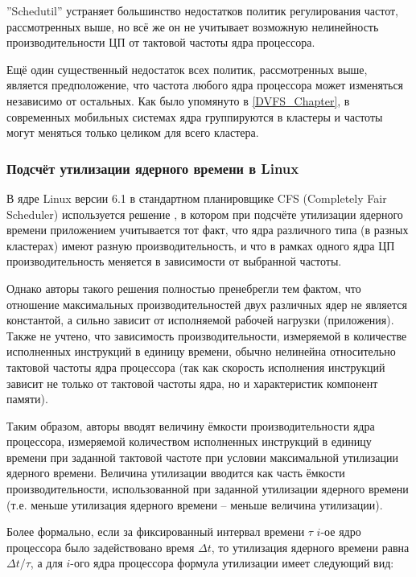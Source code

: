    ''Schedutil'' устраняет большинство недостатков политик регулирования частот, рассмотренных выше,
    но всё же он не учитывает возможную нелинейность производительности ЦП от тактовой частоты ядра
    процессора.

    Ещё один существенный недостаток всех политик, рассмотренных выше, является предположение,
    что частота любого ядра процессора может изменяться независимо от остальных.
    Как было упомянуто в \ref{DVFS_Chapter}, в современных мобильных системах ядра группируются
    в кластеры и частоты могут меняться только целиком для всего кластера.

\subsubsection{Подсчёт утилизации ядерного времени в Linux} \label{linux_util}

    В ядре Linux версии 6.1 в стандартном планировщике CFS (Completely Fair Scheduler)
    используется решение \cite{KernelDocsCapacity}, в котором при подсчёте утилизации ядерного времени
    приложением учитывается тот факт, что ядра различного типа (в разных кластерах) имеют разную
    производительность, и что в рамках одного ядра ЦП производительность меняется
    в зависимости от выбранной частоты.

    Однако авторы такого решения полностью пренебрегли тем фактом, что отношение максимальных
    производительностей двух различных ядер не является константой, а сильно зависит от
    исполняемой рабочей нагрузки (приложения). Также не учтено, что зависимость производительности,
    измеряемой в количестве исполненных инструкций в единицу времени, обычно нелинейна относительно
    тактовой частоты ядра процессора (так как скорость исполнения инструкций зависит не только от
    тактовой частоты ядра, но и характеристик компонент памяти).

    Таким образом, авторы вводят величину ёмкости производительности ядра процессора,
    измеряемой количеством исполненных инструкций в единицу времени при заданной тактовой частоте
    при условии максимальной утилизации ядерного времени. Величина утилизации вводится как часть
    ёмкости производительности, использованной при заданной утилизации ядерного времени (т.е.
    меньше утилизация ядерного времени -- меньше величина утилизации).

    Более формально, если за фиксированный интервал времени $\tau$ $i$-ое ядро процессора было задействовано
    время $\Delta t$, то утилизация ядерного времени равна $\Delta t / \tau$, а для
    $i$-ого ядра процессора формула утилизации имеет следующий вид:

